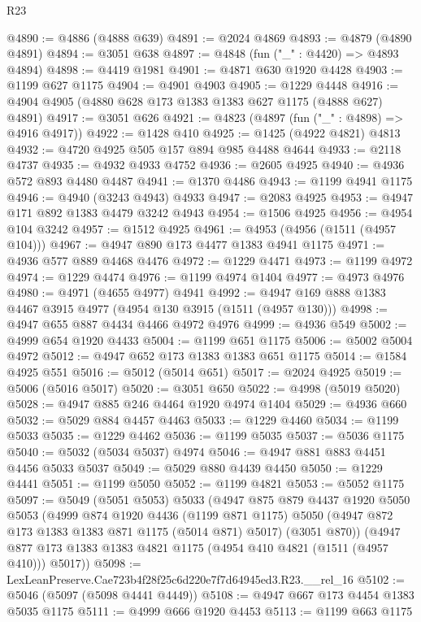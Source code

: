 \begin{lexlean}{R23}
\begin{coremodule}
@4890 := @4886 (@4888 @639)
@4891 := @2024 @4869
@4893 := @4879 (@4890 @4891)
@4894 := @3051 @638
@4897 := @4848 (fun ("_" : @4420) => @4893 @4894)
@4898 := @4419 @1981
@4901 := @4871 @630 @1920 @4428
@4903 := @1199 @627 @1175
@4904 := @4901 @4903
@4905 := @1229 @4448
@4916 := @4904 @4905 (@4880 @628 @173 @1383 @1383 @627 @1175 (@4888 @627) @4891)
@4917 := @3051 @626
@4921 := @4823 (@4897 (fun ("_" : @4898) => @4916 @4917))
@4922 := @1428 @410
@4925 := @1425 (@4922 @4821) @4813
@4932 := @4720 @4925 @505 @157 @894 @985 @4488 @4644
@4933 := @2118 @4737
@4935 := @4932 @4933 @4752
@4936 := @2605 @4925
@4940 := @4936 @572 @893 @4480 @4487
@4941 := @1370 @4486
@4943 := @1199 @4941 @1175
@4946 := @4940 (@3243 @4943) @4933
@4947 := @2083 @4925
@4953 := @4947 @171 @892 @1383 @4479 @3242 @4943
@4954 := @1506 @4925
@4956 := @4954 @104 @3242
@4957 := @1512 @4925
@4961 := @4953 (@4956 (@1511 (@4957 @104)))
@4967 := @4947 @890 @173 @4477 @1383 @4941 @1175
@4971 := @4936 @577 @889 @4468 @4476
@4972 := @1229 @4471
@4973 := @1199 @4972
@4974 := @1229 @4474
@4976 := @1199 @4974 @1404
@4977 := @4973 @4976
@4980 := @4971 (@4655 @4977) @4941
@4992 := @4947 @169 @888 @1383 @4467 @3915 @4977 (@4954 @130 @3915 (@1511 (@4957 @130)))
@4998 := @4947 @655 @887 @4434 @4466 @4972 @4976
@4999 := @4936 @549
@5002 := @4999 @654 @1920 @4433
@5004 := @1199 @651 @1175
@5006 := @5002 @5004 @4972
@5012 := @4947 @652 @173 @1383 @1383 @651 @1175
@5014 := @1584 @4925 @551
@5016 := @5012 (@5014 @651)
@5017 := @2024 @4925
@5019 := @5006 (@5016 @5017)
@5020 := @3051 @650
@5022 := @4998 (@5019 @5020)
@5028 := @4947 @885 @246 @4464 @1920 @4974 @1404
@5029 := @4936 @660
@5032 := @5029 @884 @4457 @4463
@5033 := @1229 @4460
@5034 := @1199 @5033
@5035 := @1229 @4462
@5036 := @1199 @5035
@5037 := @5036 @1175
@5040 := @5032 (@5034 @5037) @4974
@5046 := @4947 @881 @883 @4451 @4456 @5033 @5037
@5049 := @5029 @880 @4439 @4450
@5050 := @1229 @4441
@5051 := @1199 @5050
@5052 := @1199 @4821
@5053 := @5052 @1175
@5097 := @5049
    (@5051 @5053)
    @5033
    (@4947
      @875
      @879
      @4437
      @1920
      @5050
      @5053
      (@4999
        @874
        @1920
        @4436
        (@1199 @871 @1175)
        @5050
        (@4947 @872 @173 @1383 @1383 @871 @1175 (@5014 @871) @5017)
        (@3051 @870))
      (@4947 @877 @173 @1383 @1383 @4821 @1175 (@4954 @410 @4821 (@1511 (@4957 @410))) @5017))
@5098 := LexLeanPreserve.Cae723b4f28f25c6d220e7f7d64945ed3.R23.__rel_16
@5102 := @5046 (@5097 (@5098 @4441 @4449))
@5108 := @4947 @667 @173 @4454 @1383 @5035 @1175
@5111 := @4999 @666 @1920 @4453
@5113 := @1199 @663 @1175

\end{coremodule}
\end{lexlean}
